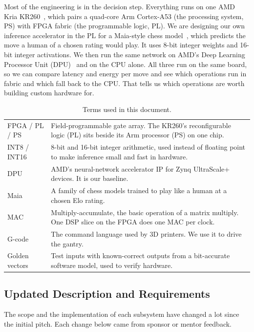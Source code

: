 \documentclass[10pt]{article}
\begin{document}
Most of the engineering is in the decision step. Everything runs on one AMD Kria KR260~\cite{kr260},
which pairs a quad-core Arm Cortex-A53 (the processing system, PS) with FPGA fabric (the
programmable logic, PL). We are designing our own inference accelerator in the PL for a Maia-style
chess model~\cite{maia, chessformer}, which predicts the move a human of a chosen rating would play.
It uses 8-bit integer weights and 16-bit integer activations. We then run the same network on AMD's
Deep Learning Processor Unit (DPU)~\cite{dpu} and on the CPU alone. All three run on the same board,
so we can compare latency and energy per move and see which operations run in fabric and which fall
back to the CPU. That tells us which operations are worth building custom hardware for.

\begin{table}[H]
\centering\small
\caption{Terms used in this document.}
\begin{tabularx}{\textwidth}{@{}P{2.7cm} L@{}}
\toprule
FPGA / PL / PS & Field-programmable gate array. The KR260's reconfigurable logic (PL) sits beside its Arm processor (PS) on one chip. \\
INT8 / INT16 & 8-bit and 16-bit integer arithmetic, used instead of floating point to make inference small and fast in hardware. \\
DPU & AMD's neural-network accelerator IP for Zynq UltraScale+ devices. It is our baseline. \\
Maia & A family of chess models trained to play like a human at a chosen Elo rating. \\
MAC & Multiply-accumulate, the basic operation of a matrix multiply. One DSP slice on the FPGA does one MAC per clock. \\
G-code & The command language used by 3D printers. We use it to drive the gantry. \\
Golden vectors & Test inputs with known-correct outputs from a bit-accurate software model, used to verify hardware. \\
\bottomrule
\end{tabularx}
\end{table}

\subsection{Updated Description and Requirements}

The scope and the implementation of each subsystem have changed a lot since the initial pitch. Each
change below came from sponsor or mentor feedback.
\end{document}

